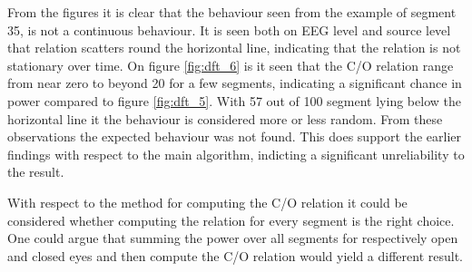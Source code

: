 \noindent
From the figures it is clear that the behaviour seen from the example of segment 35, is not a continuous behaviour. It is seen both on EEG level and source level that relation scatters round the horizontal line, indicating that the relation is not stationary over time. 
On figure \ref{fig:dft_6} is it seen that the C/O relation range from near zero to beyond 20 for a few segments, indicating a significant chance in power compared to figure \ref{fig:dft_5}. With 57 out of 100 segment lying below the horizontal line it the behaviour is considered more or less random. 
From these observations the expected behaviour was not found. This does support the earlier findings with respect to the main algorithm, indicting a significant unreliability to the result.

With respect to the method for computing the C/O relation it could be considered whether computing the relation for every segment is the right choice. One could argue that summing the power over all segments for respectively open and closed eyes and then compute the C/O relation would yield a different result.  